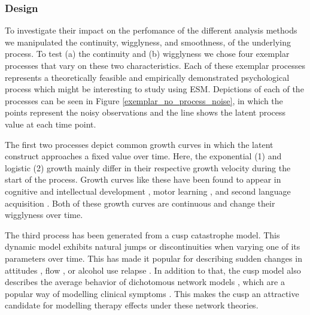 \subsubsection{Design}

To investigate their impact on the perfomance of the different analysis methods
we manipulated the continuity, wigglyness, and smoothness, of the underlying
process. To test (a) the continuity and (b) wigglyness we chose four exemplar
processes that vary on these two characteristics. Each of these exemplar
processes represents a theoretically feasible and empirically demonstrated
psychological process which might be interesting to study using ESM.
Depictions of each of the processes can be seen in Figure
\ref{exemplar_no_process_noise}, in which the points represent the noisy
observations and the line shows the latent process value at each time point.

\begin{figure*}
    \caption{Non-linear exemplar processes}
    \label{exemplar_no_process_noise}
\end{figure*}

The first two processes depict common growth curves in which the latent
construct approaches a fixed value over time.
Here, the exponential (1) and logistic (2) growth mainly differ in their
respective growth velocity during the start of the process. Growth curves
like these have been found to appear in cognitive and intellectual development
\parencite{mcardle_comparative_2002,kunnen_dynamic_2012}, motor learning
\parencite{newell_time_2001}, and second language acquisition
\parencite{de_bot_dynamic_2007}. Both of these growth curves are continuous and
change their wigglyness over time.

The third process has been generated from a cusp catastrophe model.
This dynamic model exhibits natural jumps or discontinuities when
varying one of its parameters over time. This has made it popular for
describing sudden changes in attitudes \parencite{van_der_maas_sudden_2003},
flow \parencite{ceja_dynamics_2009}, or alcohol use relapse
\parencite{witkiewitz_modeling_2007}. In addition to that, the cusp model also
describes the average behavior of dichotomous network models
\parencite{finnemann_theoretical_2021}, which are a popular way of modelling
clinical symptoms \parencite{borsboom_network_2013}. This makes the cusp an
attractive candidate for modelling therapy effects under these network
theories.

